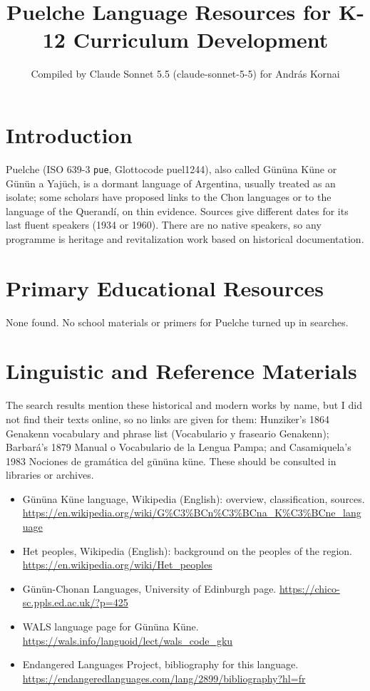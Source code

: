 \documentclass[12pt]{article}
\title{Puelche Language Resources for K-12 Curriculum Development}
\author{Compiled by Claude Sonnet 5.5 (claude-sonnet-5-5) for Andr\'as Kornai}
\date{}
\begin{document}
\maketitle

\section{Introduction}
Puelche (ISO 639-3 \texttt{pue}, Glottocode puel1244), also called Gününa Küne or Günün a Yajüch, is a dormant language of Argentina, usually treated as an isolate; some scholars have proposed links to the Chon languages or to the language of the Querandí, on thin evidence. Sources give different dates for its last fluent speakers (1934 or 1960). There are no native speakers, so any programme is heritage and revitalization work based on historical documentation.

\section{Primary Educational Resources}
None found. No school materials or primers for Puelche turned up in searches.

\section{Linguistic and Reference Materials}
The search results mention these historical and modern works by name, but I did not find their texts online, so no links are given for them: Hunziker's 1864 Genakenn vocabulary and phrase list (Vocabulario y fraseario Genakenn); Barbará's 1879 Manual o Vocabulario de la Lengua Pampa; and Casamiquela's 1983 Nociones de gramática del gününa küne. These should be consulted in libraries or archives.
\begin{itemize}
\item Gününa Küne language, Wikipedia (English): overview, classification, sources. \url{https://en.wikipedia.org/wiki/G%C3%BCn%C3%BCna_K%C3%BCne_language}
\item Het peoples, Wikipedia (English): background on the peoples of the region. \url{https://en.wikipedia.org/wiki/Het_peoples}
\item Günün-Chonan Languages, University of Edinburgh page. \url{https://chico-sc.ppls.ed.ac.uk/?p=425}
\item WALS language page for Gününa Küne. \url{https://wals.info/languoid/lect/wals_code_gku}
\item Endangered Languages Project, bibliography for this language. \url{https://endangeredlanguages.com/lang/2899/bibliography?hl=fr}
\end{itemize}
\end{document}
